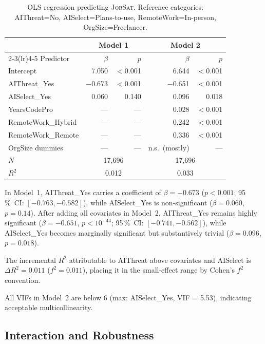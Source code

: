 \documentclass[11pt]{article}
\begin{document}
\begin{table}[h]
\centering
\caption{OLS regression predicting \textsc{JobSat}. Reference categories:
AIThreat=No, AISelect=Plans-to-use, RemoteWork=In-person, OrgSize=Freelancer.}
\label{tab:regression}
\small
\begin{tabular}{lrrrr}
\toprule
 & \multicolumn{2}{c}{Model 1} & \multicolumn{2}{c}{Model 2} \\
\cmidrule(lr){2-3}\cmidrule(lr){4-5}
Predictor & $\beta$ & $p$ & $\beta$ & $p$ \\
\midrule
Intercept         &  7.050 & $<$0.001 & 6.644 & $<$0.001 \\
AIThreat\_Yes     & $-$0.673 & $<$0.001 & $-$0.651 & $<$0.001 \\
AISelect\_Yes     & 0.060  & 0.140    & 0.096 & 0.018 \\
YearsCodePro      & ---    & ---      & 0.028 & $<$0.001 \\
RemoteWork\_Hybrid & ---   & ---      & 0.242 & $<$0.001 \\
RemoteWork\_Remote & ---   & ---      & 0.336 & $<$0.001 \\
OrgSize dummies   & ---    & ---      & n.s.\ (mostly) & --- \\
\midrule
$N$  & \multicolumn{2}{c}{17{,}696} & \multicolumn{2}{c}{17{,}696} \\
$R^2$ & \multicolumn{2}{c}{0.012} & \multicolumn{2}{c}{0.033} \\
\bottomrule
\end{tabular}
\end{table}

In Model~1, AIThreat\_Yes carries a coefficient of $\beta = -0.673$
($p < 0.001$; 95\,\%~CI: $[-0.763, -0.582]$), while AISelect\_Yes is
non-significant ($\beta = 0.060$, $p = 0.14$). After adding all covariates
in Model~2, AIThreat\_Yes remains highly significant
($\beta = -0.651$, $p < 10^{-44}$; 95\,\%~CI: $[-0.741, -0.562]$),
while AISelect\_Yes becomes marginally significant but substantively
trivial ($\beta = 0.096$, $p = 0.018$).

The incremental $R^2$ attributable to AIThreat above covariates and AISelect
is $\Delta R^2 = 0.011$ ($f^2 = 0.011$), placing it in the small-effect
range by Cohen's $f^2$ convention.

All VIFs in Model~2 are below 6 (max: AISelect\_Yes, VIF = 5.53),
indicating acceptable multicollinearity.

\subsection{Interaction and Robustness}
\end{document}
